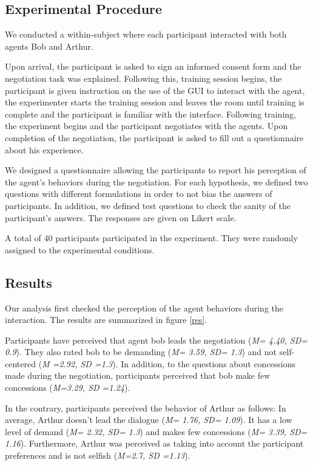\documentclass[runningheads,a4paper]{llncs}
\begin{document}
	\subsection{Experimental Procedure}
	We conducted a within-subject where each participant interacted with both  agents Bob and Arthur.
	
	Upon arrival, the participant is asked to sign an informed consent form and the negotiation task was explained. Following this, training session begins, the participant is given instruction on the use of the GUI to interact with the agent, the experimenter starts the training session and leaves the room until training is complete and the participant is familiar with the interface. Following training, the experiment begins and the participant negotiates with the agents. Upon completion of the negotiation, the participant is asked to fill out a questionnaire about his experience.
	
	We designed a questionnaire allowing the participants to report his perception of the agent's behaviors during the negotiation. For each hypothesis, we defined two questions with different formulations in order to not bias the answers of participants. In addition, we defined test questions to check the sanity of the participant's answers. The responses are given on Likert scale.
	
	
	A total of 40 participants participated in the experiment. They were randomly assigned to the experimental conditions.%
	
	\subsection{Results}
	
	
	Our analysis first checked the perception of the agent behaviors during the interaction. The results are summarized in figure \ref{res}.
	
	Participants have perceived that agent bob leads the negotiation (\emph{M= 4.40, SD= 0.9}). They also rated bob to be demanding (\emph{M= 3.59, SD= 1.3}) and not self-centered (\emph{M =2.92, SD =1.3}). In addition, to the questions about concessions made during the negotiation, participants perceived that bob make few concessions (\emph{M=3.29, SD =1.24}).
	
	In the contrary, participants perceived the behavior of Arthur as follows: In average, Arthur doesn't lead the dialogue (\emph{M= 1.76, SD= 1.09}). It has a low level of demand (\emph{M= 2.32, SD= 1.3}) and makes few concessions (\emph{M= 3.39, SD= 1.16}). Furthermore, Arthur was perceived as taking into account the participant preferences and is not selfish (\emph{M=2.7, SD =1.13}).
	
\end{document}
